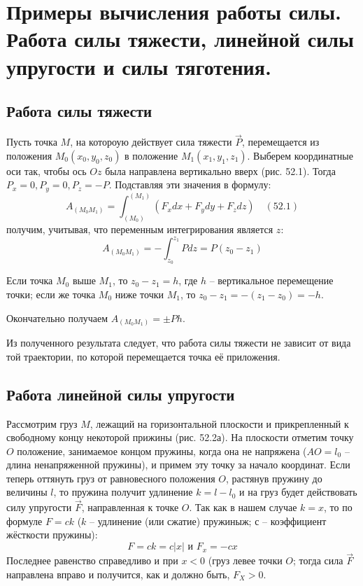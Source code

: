\chapter{Примеры вычисления работы силы. Работа силы тяжести, линейной силы
упругости и силы тяготения.}

\section{Работа силы тяжести}
Пусть точка \( M \), на котороую действует сила тяжести \( \vec{P} \), 
перемещается из положения \( M_0(x_0, y_0, z_0) \) в положение 
\( M_1(x_1, y_1, z_1) \). Выберем координатные оси так, чтобы ось \( Oz \) 
была направлена вертикально вверх (рис. 52.1). Тогда 
\( P_x = 0, P_y = 0, P_z = -P \). Подставляя эти значения в формулу:
\[ 
    A_{(M_0 M_1)} = \int_{(M_0)}^{(M_1)} 
    \left( F_x dx + F_y dy + F_z dz \right) \quad (52.1)
\]
получим, учитывая, что переменным интегрирования является \( z \):
\[ 
    A_{(M_0 M_1)} = - \int_{z_0}^{z_1} Pdz = 
    P\left(z_0 - z_1 \right) 
\]

Если точка \( M_0 \) выше \( M_1 \), то \( z_0 - z_1 = h \), где 
\( h \) -- вертикальное перемещение точки; если же точка \( M_0 \) ниже 
точки \( M_1 \), то \( z_0 - z_1 = -\left(z_1 - z_0\right) = -h \).

Окончательно получаем \( A_{(M_0 M_1)} = \pm Ph \).

Из полученного результата следует, что работа силы тяжести не зависит от 
вида той траектории, по которой перемещается точка её приложения.

\section{Работа линейной силы упругости}
Рассмотрим груз \( M \), лежащий на горизонтальной плоскости и 
прикрепленный к свободному концу некоторой прижины (рис. 52.2а). На 
плоскости отметим точку \( O \) положение, занимаемое концом пружины, 
когда она не напряжена (\( AO = l_0 \) -- длина ненапряженной пружины), и 
примем эту точку за начало координат. Если теперь оттянуть груз от 
равновесного положения \( O \), растянув пружину до величины \( l \), то
пружина получит удлинение \( k = l - l_0 \) и на груз будет действовать 
силу упругости \( \vec{F} \), направленная к точке \( O \). Так как в 
нашем случае \( k = x \), то по формуле \( F = ck \) 
(\( k \) -- удлинение (или сжатие) пружиныж; \( с \) -- коэффициент 
жёсткости пружины):
\[ F = ck = c|x| \text{ и } F_x = -cx \]
Последнее равенство справедливо и при \( x < 0 \) 
(груз левее точки \( O \); тогда сила \( \vec{F} \) направлена вправо и 
получится, как и должно быть, \( F_X > 0 \).

